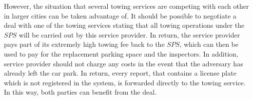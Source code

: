 However, the situation that several towing services are competing with each other in larger cities can be taken advantage of. It should be possible to negotiate a deal with one of the towing services stating that all towing operations under the $SPS$ will be carried out by this service provider. In return, the service provider pays part of its extremely high towing fee back to the $SPS$, which can then be used to pay for the replacement parking space and the inspectors. In addition, service provider should not charge any costs in the event that the adversary has already left the car park. In return, every report, that contains a license plate which is not registered in the system, is forwarded directly to the towing service. In this way, both parties can benefit from the deal.